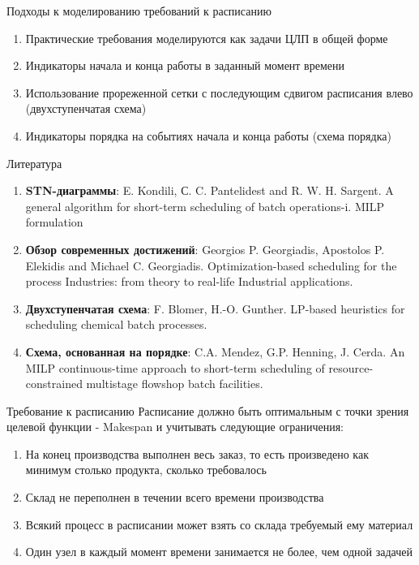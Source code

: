 \documentclass{beamer}
\begin{document}
\begin{frame}{Подходы к моделированию требований к расписанию}
\begin{enumerate}
	\item Практические требования моделируются как задачи ЦЛП в общей форме
	\item Индикаторы начала и конца работы в заданный момент времени 
	\item Использование прореженной сетки с последующим сдвигом расписания влево (двухступенчатая схема)
	\item Индикаторы порядка на событиях начала и конца работы (схема порядка)
\end{enumerate}

\end{frame}

\begin{frame}{Литература}
	\begin{enumerate}
	\item \textbf{STN-диаграммы}: E. Kondili, С. C. Pantelidest and R. W. H. Sargent. A general algorithm for short-term scheduling of batch operations-i. MILP formulation
	\item \textbf{Обзор современных достижений}: Georgios P. Georgiadis, Apostolos P. Elekidis and Michael C. Georgiadis. Optimization-based scheduling for the process Industries: from theory to real-life Industrial applications.
	\item \textbf{Двухступенчатая схема}: F. Blomer, H.-O. Gunther. LP-based heuristics for scheduling chemical batch processes.
	\item \textbf{Схема, основанная на порядке}: C.A. Mendez, G.P. Henning, J. Cerda. An MILP continuous-time approach to short-term scheduling of resource-constrained multistage flowshop batch facilities.
\end{enumerate}
\end{frame}

\begin{frame}{Требование к расписанию}
	Расписание должно быть оптимальным с точки зрения целевой функции - Makespan и учитывать следующие ограничения:
	\begin{enumerate}
	\item На конец производства выполнен весь заказ, то есть произведено как минимум столько продукта, сколько требовалось
	\item Склад не переполнен в течении всего времени производства
	\item Всякий процесс в расписании может взять со склада требуемый ему материал
	\item Один узел в каждый момент времени занимается не более, чем одной задачей
\end{enumerate}
\end{frame}
\end{document}
